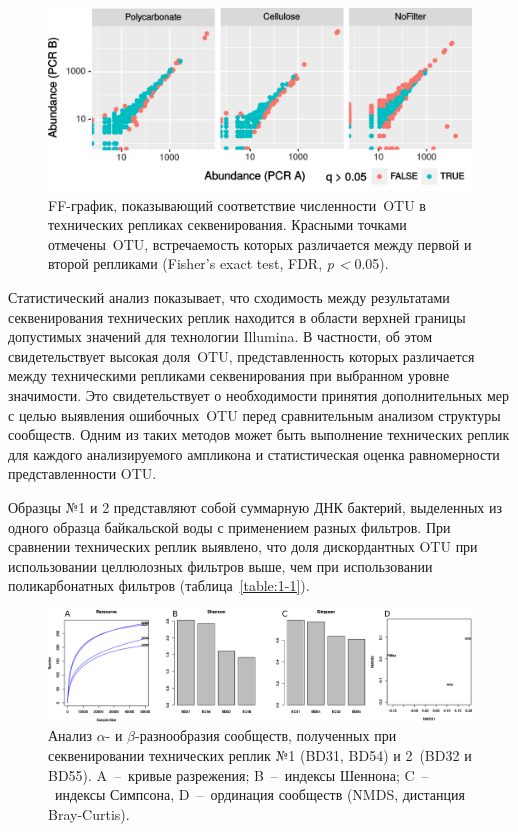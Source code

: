 \documentclass[a4paper,12pt,openany,final]{extreport}
\def\oldcaption{} \let\oldcaption=\caption
\def\caption{\stepcounter{captionsnum}\oldcaption}
\begin{document}
\begin{figure}[bhtp]\centering
\includegraphics[width=0.9\linewidth]{media/image5.png}

\caption{FF-график, показывающий соответствие численности~OTU в технических репликах секвенирования. Красными точками отмечены~OTU, встречаемость которых различается между первой и второй репликами (Fisher's exact test, FDR, \emph{p \textless{}} 0.05).}\label{fig:1-1}
\end{figure}

Статистический анализ показывает, что сходимость между результатами секвенирования технических реплик находится в области верхней границы допустимых значений для технологии Illumina. В частности, об этом свидетельствует высокая доля~OTU, представленность которых различается между техническими репликами секвенирования при выбранном уровне значимости. Это свидетельствует о необходимости принятия дополнительных мер с целью выявления ошибочных~OTU перед сравнительным анализом структуры сообществ. Одним из таких методов может быть выполнение технических реплик для каждого анализируемого ампликона и статистическая оценка равномерности представленности OTU.

Образцы №1 и 2 представляют собой суммарную ДНК бактерий, выделенных из одного образца байкальской воды с применением разных фильтров. При сравнении технических реплик выявлено, что доля дискордантных OTU при использовании целлюлозных фильтров выше, чем при использовании поликарбонатных фильтров (таблица~\ref{table:1-1}).

\begin{figure}\centering
  \includegraphics[width=0.9\linewidth]{media/image6.png}
  \caption{Анализ \(\alpha\)- и \(\beta\)-разнообразия сообществ, полученных при секвенировании
технических реплик №1 (BD31, BD54) и 2~(BD32 и BD55). A~--~кривые
разрежения; B~--~индексы Шеннона; C~--~индексы Симпсона, D~--~ординация
сообществ (NMDS, дистанция Bray-Curtis).}\label{fig:2}
\end{figure}
\end{document}
